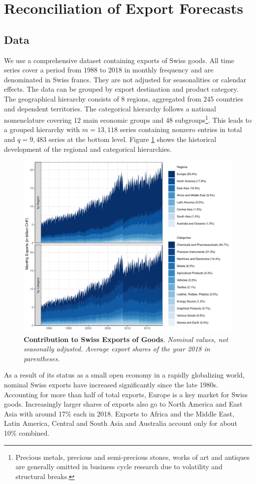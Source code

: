 \documentclass[a4paper,fleqn,11pt]{article}
\begin{document}
\clearpage


\section{Reconciliation of Export Forecasts}
\label{sec:appl}
\subsection{Data}
We use a comprehensive dataset containing exports of Swiss goods. All time series cover a period from 1988 to 2018 in monthly frequency and are denominated in Swiss francs. They are not adjusted for seasonalities or calendar effects. The data can be grouped by export destination and product category. The geographical hierarchy consists of 8 regions, aggregated from 245 countries and dependent territories. The categorical hierarchy follows a national nomenclature covering 12 main economic groups and 48 subgroups\footnote{Precious metals, precious and semi-precious stones, works of art and antiques are generally omitted in business cycle research due to volatility and structural breaks.}. This leads to a grouped hierarchy with $m = 13,118$ series containing nonzero entries in total and $q = 9,483$ series at the bottom level. Figure \ref{fig:area} shows the historical development of the regional and categorical hierarchies.
\begin{figure}[H]
	\includegraphics[width=\textwidth]{fig/fig_area}
	\caption[Contribution to Swiss Exports of Goods]{\textbf{Contribution to Swiss Exports of Goods}. \textit{Nominal values, not seasonally adjusted. Average export shares of the year 2018 in parentheses.}}\label{fig:area}
\end{figure}
As a result of its status as a small open economy in a rapidly globalizing world, nominal Swiss exports have increased significantly since the late 1980s. Accounting for more than half of total exports, Europe is a key market for Swiss goods. Increasingly larger shares of exports also go to North America and East Asia with around 17\% each in 2018. Exports to Africa and the Middle East, Latin America, Central and South Asia and Australia account only for about 10\% combined.
\end{document}
